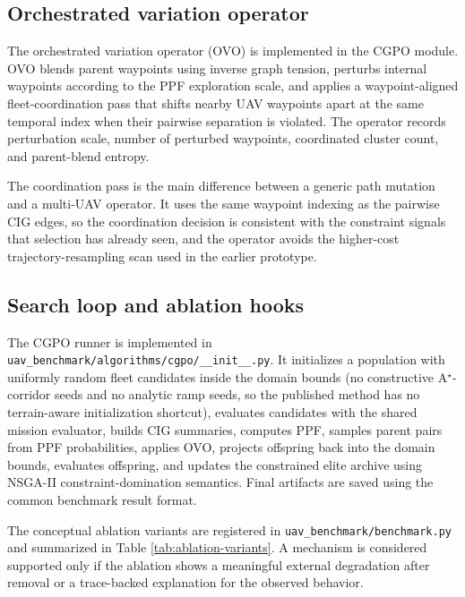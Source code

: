 \documentclass[a4paper,fleqn]{cas-dc}
\begin{document}
\subsection{Orchestrated variation operator}

The orchestrated variation operator (OVO) is implemented in the CGPO module. OVO blends parent waypoints using inverse graph tension, perturbs internal waypoints according to the PPF exploration scale, and applies a waypoint-aligned fleet-coordination pass that shifts nearby UAV waypoints apart at the same temporal index when their pairwise separation is violated. The operator records perturbation scale, number of perturbed waypoints, coordinated cluster count, and parent-blend entropy.

The coordination pass is the main difference between a generic path mutation and a multi-UAV operator. It uses the same waypoint indexing as the pairwise CIG edges, so the coordination decision is consistent with the constraint signals that selection has already seen, and the operator avoids the higher-cost trajectory-resampling scan used in the earlier prototype.

\subsection{Search loop and ablation hooks}

The CGPO runner is implemented in \texttt{uav\_benchmark/algorithms/cgpo/\_\_init\_\_.py}. It initializes a population with uniformly random fleet candidates inside the domain bounds (no constructive A$^\star$-corridor seeds and no analytic ramp seeds, so the published method has no terrain-aware initialization shortcut), evaluates candidates with the shared mission evaluator, builds CIG summaries, computes PPF, samples parent pairs from PPF probabilities, applies OVO, projects offspring back into the domain bounds, evaluates offspring, and updates the constrained elite archive using NSGA-II constraint-domination semantics. Final artifacts are saved using the common benchmark result format.

The conceptual ablation variants are registered in \texttt{uav\_benchmark/benchmark.py} and summarized in Table \ref{tab:ablation-variants}. A mechanism is considered supported only if the ablation shows a meaningful external degradation after removal or a trace-backed explanation for the observed behavior.
\end{document}
